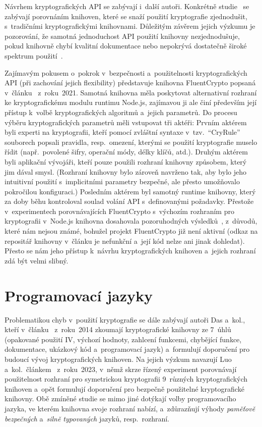Návrhem kryptografických API se zabývají i~další autoři. Konkrétně studie~\cite{comparing2017, comparative2023} se zabývají porovnáním knihoven, které se snaží použití kryptografie zjednodušit, s~tradičními kryptografickými knihovnami. Důležitým závěrem jejich výzkumu je pozorování, že samotná jednoduchost API použití knihovny nezjednodušuje, pokud knihovně chybí kvalitní dokumentace nebo nepokrývá dostatečně široké spektrum použití~\cite{comparing2017}.

Zajímavým pokusem o~pokrok v~bezpečnosti a~použitelnosti kryptografických API (při zachování jejich flexibility) představuje knihovna FluentCrypto popsaná v~článku~\cite{fluentcrypto} z~roku~2021. Samotná knihovna měla poskytovat alternativní rozhraní ke kryptografickému modulu runtimu Node.js, zajímavou ji ale činí především její přístup k~volbě kryptografických algoritmů a~jejich parametrů. Do procesu výběru kryptografických parametrů měli vstupovat tři aktéři: Prvním aktérem byli experti na kryptografii, kteří pomocí zvláštní syntaxe v~tzv.\ ``CryRule'' souborech popsali pravidla, resp.\ omezení, kterými se použití kryptografie muselo řídit (např.\ povolené šifry, operační módy, délky klíčů, atd.). Druhým aktérem byli aplikační vývojáři, kteří pouze použili rozhraní knihovny způsobem, který jim dával smysl. (Rozhraní knihovny bylo zároveň navrženo tak, aby bylo jeho intuitivní použití s~implicitními parametry bezpečné, ale přesto umožňovalo pokročilou konfiguraci.) Posledním aktérem byl samotný runtime knihovny, který za doby běhu kontroloval soulad volání API s~definovanými požadavky. Přestože v~experimentech porovnávajících FluentCrypto s~výchozím rozhraním pro kryptografii v~Node.js knihovna dosahovala pozoruhodných výsledků~\cite{fluentcrypto}, z~důvodů, které nám nejsou známé, bohužel projekt FluentCrypto již není aktivní (odkaz na repositář knihovny v~článku je nefunkční a~její kód nelze ani jinak dohledat). Přesto se nám jeho přístup k~návrhu kryptografických knihoven a~jejich rozhraní zdá být velmi slibný.

\section{Programovací jazyky}

Problematikou chyb v~použití kryptografie se dále zabývají autoři Das a~kol., kteří v~článku~\cite{das2014iv} z~roku~2014 z\-kou\-ma\-jí kryptografické knihovny ze 7~úhlů (opakované použití IV, výchozí hodnoty, zahlcení funkcemi, chybějící funkce, dokumentace, ukázkový kód a~programovací jazyk) a~formulují doporučení pro budoucí vývoj kryptografických knihoven. Na jejich výzkum navazují Luo a~kol.\ článkem~\cite{comparative2023} z~roku~2023, v~němž skrze řízený experiment porovnávají použitelnost rozhraní pro symetrickou kryptografii 9~růz\-ných kryptografických knihoven a~opět formulují doporučení pro bezpečně použitelné kryptografické knihovny. Obě zmíněné studie se mimo jiné dotýkají volby programovacího jazyka, ve kterém knihovna svoje rozhraní nabízí, a~zdůrazňují výhody \emph{paměťově bezpečných} a~\emph{silně typovaných} jazyků, resp.\ rozhraní.

